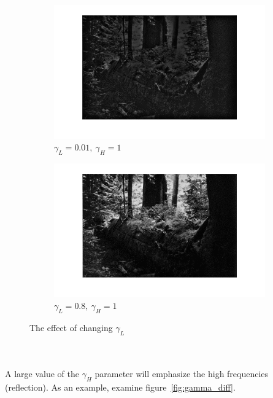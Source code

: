 		\begin{figure}[h!]
		\centering
		\begin{subfigure}[b]{0.5\textwidth}
			\includegraphics[width=\textwidth]{pics/suppressed_low_frequences.png}
			\caption{$\gamma_L = 0.01,~\gamma_H = 1$}
			\label{fig:low_freq_supp}
			\end{subfigure}%
			\begin{subfigure}[b]{0.5\textwidth}
			\includegraphics[width=\textwidth]{pics/non_suppressed_low_frequences.png}
			\caption{$\gamma_L = 0.8,~\gamma_H = 1$}
			\label{fig:low_freq_non_supp}
			\end{subfigure}
			\label{fig:various_low_gamma}
			\caption{The effect of changing $\gamma_L$}				
		\end{figure}		
		\\
		\\
		A large value of the $\gamma_H$ parameter 
		will emphasize the high frequencies (reflection). As an example, 
		examine figure~\ref{fig:gamma_diff}.
